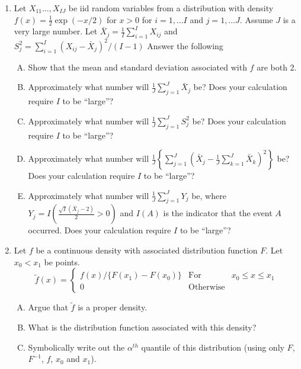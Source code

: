 \documentclass[12pt]{article}
\begin{document}
\begin{enumerate}[1.]
\item Let $X_{11} \ldots, X_{IJ}$ be iid random variables from a distribution
  with density $f(x) = \frac{1}{2}\exp(-x/2)$ for $x > 0$ for $i=1,\ldots I$ and $j = 1, \ldots J$.
  Assume $J$ is a very large number. Let $\bar X_j = \frac{1}{I} \sum_{i=1}^I X_{ij}$ and 
  $S_j^2 = \sum_{i=1}^I (X_{ij} - \bar X_{j})^2 / (I - 1)$ Answer the following
  \begin{enumerate}[A.]
  \item Show that the mean and standard deviation associated with $f$ are both 2.  
  \item Approximately what number will $\frac{1}{J}\sum_{j=1}^J \bar X_j$ be? Does your calculation require $I$ to be ``large''?
  \item Approximately what number will $\frac{1}{J}\sum_{j=1}^J S_j^2$ be?  Does your calculation require $I$ to be ``large''?
  \item Approximately what number will $\frac{1}{J}\left\{ \sum_{j=1}^J\left(\bar X_j - \frac{1}{J} \sum_{k=1}^J \bar X_k\right)^2\right\}$ be? Does your calculation require $I$ to be ``large''?
  \item Approximately what number will $\frac{1}{J}\sum_{j=1}^J Y_j$ be, where $Y_j = I\left(\frac{\sqrt{I}(\bar X_j - 2)}{2} > 0\right)$ and $I(A)$ is the indicator that
    the event $A$ occurred. Does your calculation require $I$ to be ``large''?
  \end{enumerate}

\newpage

\item Let $f$ be a continuous density with associated distribution function $F$. Let $x_0 < x_1$ be points. 
$$
\tilde f(x) = \left\{
  \begin{array}{lll}
    f(x) / \{F(x_1) - F(x_0)\} & \mbox{For} &  x_0 \leq x \leq x_1\\
    0 & \mbox{Otherwise} & 
  \end{array}
\right.
$$ 
\begin{enumerate}[A.]
\item Argue that $\tilde f$ is a proper density.
\item What is the distribution function associated with this density?
\item Symbolically write out the $\alpha^{th}$ quantile of this distribution (using only $F$, $F^{-1}$, $f$, $x_0$ and $x_1$).
\end{enumerate}


\end{enumerate}
\end{document}
